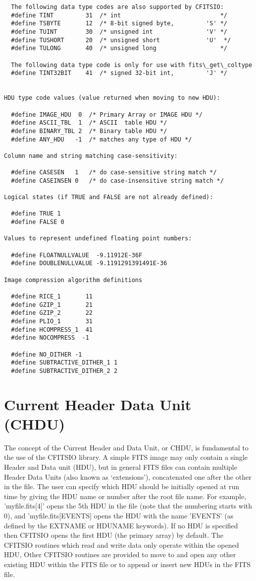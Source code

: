 \documentclass[11pt]{book}
\begin{document}
\begin{verbatim}
  The following data type codes are also supported by CFITSIO:
  #define TINT         31  /* int                            */
  #define TSBYTE       12  /* 8-bit signed byte,         'S' */
  #define TUINT        30  /* unsigned int               'V' */
  #define TUSHORT      20  /* unsigned short             'U'  */
  #define TULONG       40  /* unsigned long                  */

  The following data type code is only for use with fits\_get\_coltype
  #define TINT32BIT    41  /* signed 32-bit int,         'J' */


HDU type code values (value returned when moving to new HDU):

  #define IMAGE_HDU  0  /* Primary Array or IMAGE HDU */
  #define ASCII_TBL  1  /* ASCII  table HDU */
  #define BINARY_TBL 2  /* Binary table HDU */
  #define ANY_HDU   -1  /* matches any type of HDU */

Column name and string matching case-sensitivity:

  #define CASESEN   1   /* do case-sensitive string match */
  #define CASEINSEN 0   /* do case-insensitive string match */

Logical states (if TRUE and FALSE are not already defined):

  #define TRUE 1
  #define FALSE 0

Values to represent undefined floating point numbers:

  #define FLOATNULLVALUE  -9.11912E-36F
  #define DOUBLENULLVALUE -9.1191291391491E-36

Image compression algorithm definitions

  #define RICE_1       11
  #define GZIP_1       21
  #define GZIP_2       22
  #define PLIO_1       31
  #define HCOMPRESS_1  41
  #define NOCOMPRESS  -1

  #define NO_DITHER -1
  #define SUBTRACTIVE_DITHER_1 1
  #define SUBTRACTIVE_DITHER_2 2
\end{verbatim}


\section{Current Header Data Unit (CHDU)}

The concept of the Current Header and Data Unit, or CHDU, is
fundamental to the use of the CFITSIO library.  A simple FITS image may
only contain a single Header and Data unit (HDU), but in general FITS
files can contain multiple Header Data Units (also known as
`extensions'), concatenated one after the other in the file.  The user
can specify which HDU should be initially opened at run time by giving
the HDU name or number after the root file name.  For example,
'myfile.fits[4]' opens the 5th HDU in the file (note that the numbering
starts with 0), and 'myfile.fits[EVENTS] opens the HDU with the name
'EVENTS' (as defined by the EXTNAME or HDUNAME keywords).  If no HDU is
specified then CFITSIO opens the first HDU (the primary array) by
default.  The CFITSIO routines which read and write data  only operate
within the opened HDU,  Other CFITSIO routines are provided to move to
and open any other existing HDU within the FITS file or to append or
insert new HDUs in the FITS file.
\end{document}
